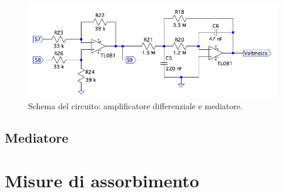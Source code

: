 \documentclass[a4paper,10pt]{article}
\begin{document}
\begin{figure}[H]
	\centering
	\includegraphics[width=\textwidth]{../grafici/DiffAmpAv.png}
	\caption{Schema del circuito: amplificatore differenziale e mediatore.}
	\label{fig:diffav}
\end{figure}


\subsection{Mediatore}

\section{Misure di assorbimento}
\end{document}
